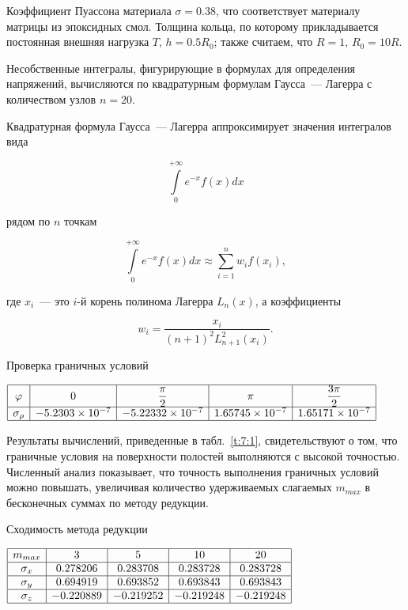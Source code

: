Коэффициент Пуассона материала $\sigma=0.38$, что соответствует материалу матрицы из эпоксидных смол. Толщина кольца, по которому прикладывается постоянная внешняя нагрузка $T$, $h=0.5R_0$; также считаем, что $R=1$, $R_0=10R$.

Несобственные интегралы, фигурирующие в формулах для определения напряжений, вычисляются по квадратурным формулам Гаусса~--- Лагерра с количеством узлов $n=20$.

Квадратурная формула Гаусса~--- Лагерра аппроксимирует значения интегралов вида

\begin{equation}
\int\limits_0^{ + \infty } {{e^{ - x}}} f(x)dx
\end{equation}

\noindent рядом по $n$ точкам

\begin{equation}
\int\limits_0^{ + \infty } {{e^{ - x}}} f(x)dx \approx \sum\limits_{i = 1}^n {{w_i}} f({x_i}),
\end{equation}

\noindent где $x_i$~--- это $i$-й корень полинома Лагерра $L_n(x)$, а коэффициенты

\begin{equation}
{w_i} = \frac{{{x_i}}}{{{{(n + 1)}^2}L_{n + 1}^2({x_i})}}.
\end{equation}

\begin{table}[h!]
\caption{Проверка граничных условий}
\centering
$
\begin{array}{|c|c|c|c|c|}
\hline
\varphi & 0 & \dfrac{\pi}{2} & \pi & \dfrac{3\pi}{2} \\
\hline
\sigma_\rho & -5.2303\times 10^{-7} & -5.22332\times 10^{-7} & 1.65745\times 10^{-7} & 1.65171\times 10^{-7} \\
\hline
\end{array}
$
\label{t:7:1}
\end{table}

Результаты вычислений, приведенные в табл.~\ref{t:7:1}, свидетельствуют о том, что граничные условия на поверхности полостей выполняются с высокой точностью. Численный анализ показывает, что точность выполнения граничных условий можно повышать, увеличивая количество удерживаемых слагаемых $m_{max}$ в бесконечных суммах по методу редукции.

\begin{table}[h!]
\caption{Сходимость метода редукции}
\centering
$
\begin{array}{|c|c|c|c|c|}
\hline
m_{max} & 3 & 5 & 10 & 20 \\
\hline
\sigma_x & 0.278206 & 0.283708 & 0.283728 & 0.283728 \\
\hline
\sigma_y & 0.694919 & 0.693852 & 0.693843 & 0.693843 \\
\hline
\sigma_z & -0.220889 & -0.219252 & -0.219248 & -0.219248 \\
\hline
\end{array}
$
\label{t:7:2}
\end{table}

